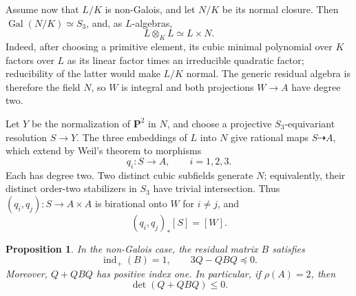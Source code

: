 \documentclass[12pt]{amsart}
\numberwithin{equation}{section}
\newtheorem{proposition}[theorem]{Proposition}
\theoremstyle{definition}
\theoremstyle{remark}
\newcommand{\PP}{\mathbf P}
\newcommand{\indp}{\operatorname{ind}_{+}}
\begin{document}
Assume now that \(L/K\) is non-Galois, and let \(N/K\) be its normal
closure.  Then \(\operatorname{Gal}(N/K)\simeq S_3\), and, as
\(L\)-algebras,
\[
                         L\otimes_KL\simeq L\times N.
\]
Indeed, after choosing a primitive element, its cubic minimal polynomial
over \(K\) factors over \(L\) as its linear factor times an irreducible
quadratic factor; reducibility of the latter would make \(L/K\) normal.
The generic residual algebra is therefore the field \(N\), so \(W\) is
integral and both projections \(W\to A\) have degree two.

Let \(Y\) be the normalization of \(\PP^2\) in \(N\), and choose a
projective \(S_3\)-equivariant resolution \(S\to Y\).  The three
embeddings of \(L\) into \(N\) give rational maps \(S\dashrightarrow A\),
which extend by Weil's theorem to morphisms
\[
                         q_i:S\longrightarrow A,\qquad i=1,2,3.
\]
Each has degree two.  Two distinct cubic subfields generate \(N\);
equivalently, their distinct order-two stabilizers in \(S_3\) have
trivial intersection.  Thus \((q_i,q_j): S\to A\times A\) is birational onto \(W\)
for \(i\ne j\), and
\begin{equation}\label{eq:pair-push}
                         (q_i,q_j)_*[S]=[W].
\end{equation}

\begin{proposition}\label{prop:hodge-tensors}
In the non-Galois case, the residual matrix $B$ satisfies
\begin{equation}\label{eq:hodge-tensor-constraints}
 \indp(B)=1,\qquad
 3Q-QBQ\preceq0.
\end{equation}
Moreover, \(Q+QBQ\) has positive index one.  In particular, if
\(\rho(A)=2\), then
\begin{equation}\label{eq:rank-two-plus-determinant}
                         \det(Q+QBQ)\le0.
\end{equation}
\end{proposition}
\end{document}
